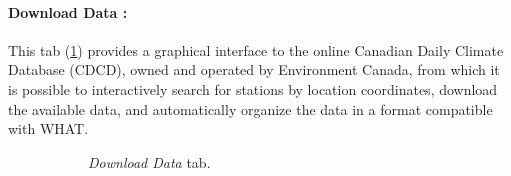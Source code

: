 \documentclass[WHATMANUAL.tex]{subfiles}
\begin{document}
\paragraph{Download Data :} This tab (\cref{subfig:ScnShot_000}) provides a graphical interface to the online Canadian Daily Climate Database (CDCD), owned and operated by Environment Canada, from which it is possible to interactively search for stations by location coordinates, download the available data, and automatically organize the data in a format compatible with WHAT.

\begin{figure}[!ht]
    \centering
    \begin{subfigure}[t]{0.45\textwidth}
        \setlength{\fboxsep}{0pt}
        \caption{\emph{Download Data} tab.}
        \label{subfig:ScnShot_000}                
    \end{subfigure}%
    \hspace{0.5cm}
    \begin{subfigure}[t]{0.45\textwidth}
        \setlength{\fboxsep}{0pt}

\end{subfigure}
\end{figure}
\end{document}
